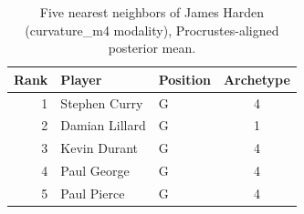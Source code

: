 \begin{table}[htbp]
  \centering\small
  \begin{tabular}{rllc}
    \toprule
    Rank & Player & Position & Archetype \\
    \midrule
    1 & Stephen Curry & G & 4 \\
    2 & Damian Lillard & G & 1 \\
    3 & Kevin Durant & G & 4 \\
    4 & Paul George & G & 4 \\
    5 & Paul Pierce & G & 4 \\
    \bottomrule
  \end{tabular}
  \caption{Five nearest neighbors of James Harden (curvature_m4 modality), Procrustes-aligned posterior mean.}
  \label{tab:James_Harden_neighbors_curvature_m4}
\end{table}

